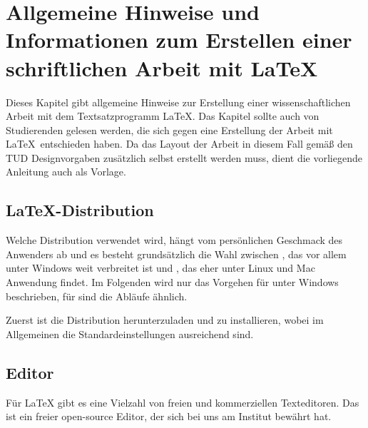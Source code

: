 \chapter{Allgemeine Hinweise und Informationen zum Erstellen einer schriftlichen Arbeit mit \LaTeX}
\label{cha:Hinweise_Latex}




Dieses Kapitel gibt allgemeine Hinweise zur Erstellung einer wissenschaftlichen Arbeit mit dem Textsatzprogramm \LaTeX. Das Kapitel sollte auch von Studierenden gelesen werden, die sich gegen eine Erstellung der Arbeit mit \LaTeX\ entschieden haben. Da das Layout der Arbeit in diesem Fall gemäß den TUD Designvorgaben zusätzlich selbst erstellt werden muss, dient die vorliegende Anleitung auch als Vorlage.



\section{\LaTeX-Distribution}
\label{sec:Distribution}
Welche Distribution verwendet wird, hängt vom persönlichen Geschmack des Anwenders ab und es besteht grundsätzlich die Wahl zwischen \Miktex{}, das vor allem unter Windows weit verbreitet ist und \texlive{}, das eher unter Linux und Mac Anwendung findet.
Im Folgenden wird nur das Vorgehen für \Miktex{} unter Windows beschrieben, für \texlive{} sind die Abläufe ähnlich.

Zuerst ist die Distribution herunterzuladen und zu installieren, wobei im Allgemeinen die Standardeinstellungen ausreichend sind.


\section{Editor}
Für \LaTeX{} gibt es eine Vielzahl von freien und kommerziellen Texteditoren. Das \Texstudio ist ein freier open-source Editor, der sich bei uns am Institut bewährt hat.

